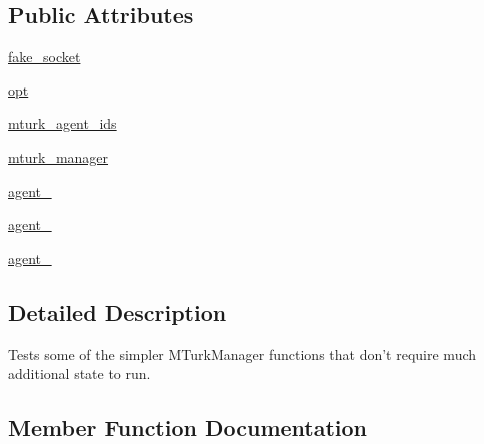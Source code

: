 \subsection*{Public Attributes}
\begin{DoxyCompactItemize}
\item 
\hyperlink{classparlai_1_1mturk_1_1core_1_1test_1_1test__mturk__manager_1_1TestMTurkManagerUnitFunctions_a15bb604fcd47c565499246fdcef30fc1}{fake\+\_\+socket}
\item 
\hyperlink{classparlai_1_1mturk_1_1core_1_1test_1_1test__mturk__manager_1_1TestMTurkManagerUnitFunctions_adf881ec4960ee5eacaa4b9784a48e8c2}{opt}
\item 
\hyperlink{classparlai_1_1mturk_1_1core_1_1test_1_1test__mturk__manager_1_1TestMTurkManagerUnitFunctions_a82534c50942dca8e7b13b569d686a5a2}{mturk\+\_\+agent\+\_\+ids}
\item 
\hyperlink{classparlai_1_1mturk_1_1core_1_1test_1_1test__mturk__manager_1_1TestMTurkManagerUnitFunctions_a12c98ab0a2684925081f30e6d7bbe0ee}{mturk\+\_\+manager}
\item 
\hyperlink{classparlai_1_1mturk_1_1core_1_1test_1_1test__mturk__manager_1_1TestMTurkManagerUnitFunctions_a429b97c4910b2259402fb2fcaa46e4ea}{agent\+\_}
\item 
\hyperlink{classparlai_1_1mturk_1_1core_1_1test_1_1test__mturk__manager_1_1TestMTurkManagerUnitFunctions_aa31d9ee8614b716bc07624fd4010782f}{agent\+\_}
\item 
\hyperlink{classparlai_1_1mturk_1_1core_1_1test_1_1test__mturk__manager_1_1TestMTurkManagerUnitFunctions_afca9c68f641d642397a8b8f6167f38b9}{agent\+\_}
\end{DoxyCompactItemize}


\subsection{Detailed Description}
\begin{DoxyVerb}Tests some of the simpler MTurkManager functions that don't require much additional
state to run.
\end{DoxyVerb}
 

\subsection{Member Function Documentation}
\mbox{\label{classparlai_1_1mturk_1_1core_1_1test_1_1test__mturk__manager_1_1TestMTurkManagerUnitFunctions_af930e15dfec4de7c1b07b286ad2a4e07}} 
